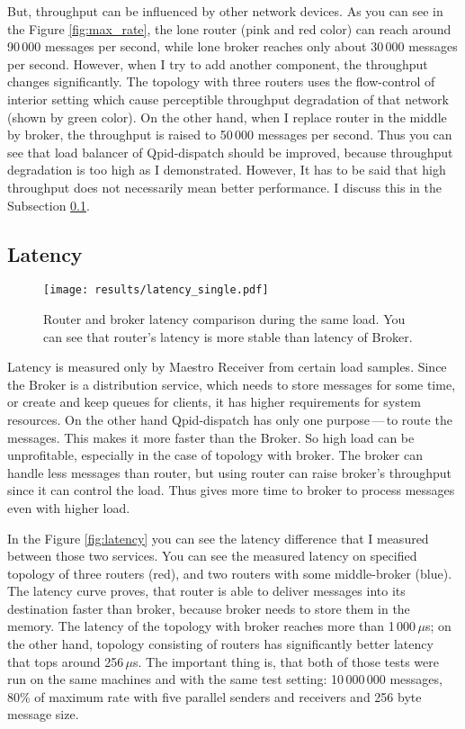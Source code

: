 \documentclass{ExcelAtFIT}
\begin{document}
But, throughput can be influenced by other network devices. As you can see in the Figure \ref{fig:max_rate}, the lone router (pink and red color) can reach around 90\,000 messages per second, while lone broker reaches only about 30\,000 messages per second. However, when I try to add another component, the throughput changes significantly. The topology with three routers uses the flow-control of interior setting which cause perceptible throughput degradation of that network (shown by green color). On the other hand, when I replace router in the middle by broker, the throughput is raised to 50\,000 messages per second. Thus you can see that load balancer of Qpid-dispatch should be improved, because throughput degradation is too high as I demonstrated. However, It has to be said that high throughput does not necessarily mean better performance. I discuss this in the Subsection \ref{Latency}.

\subsection{Latency}
\label{Latency}

\begin{figure*}[h!t]
	\centering
	\texttt{[image: results/latency\_single.pdf]}
	\caption{Router and broker latency comparison during the same load. You can see that router's latency is more stable than latency of Broker.}
	\label{fig:latency_single}
\end{figure*}

Latency is measured only by Maestro Receiver from certain load samples. Since the Broker is a distribution service, which needs to store messages for some time, or create and keep queues for clients, it has higher requirements for system resources. On the other hand Qpid-dispatch has only one purpose\,---\,to route the messages. This makes it more faster than the Broker. So high load can be unprofitable, especially in the case of topology with broker. The broker can handle less messages than router, but using router can raise broker's throughput since it can control the load. Thus gives more time to broker to process messages even with higher load.

In the Figure \ref{fig:latency} you can see the latency difference that I measured between those two services. You can see the measured latency on specified topology of three routers (red), and two routers with some middle-broker (blue). The latency curve proves, that router is able to deliver messages into its destination faster than broker, because broker needs to store them in the memory. The latency of the topology with broker reaches more than 1\,000\,$\mu$s; on the other hand, topology consisting of routers has significantly better latency that tops around 256\,$\mu$s. The important thing is, that both of those tests were run on the same machines and with the same test setting: 10\,000\,000 messages, 80\% of maximum rate with five parallel senders and receivers and 256 byte message size.
\end{document}

